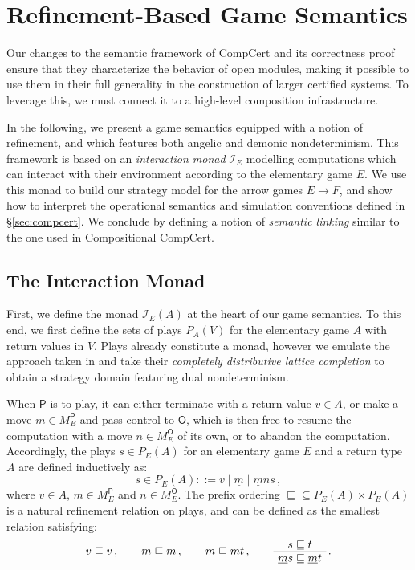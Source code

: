 \documentclass[format=sigplan,authordraft]{acmart}
\newcommand{\kw}[1]{\ensuremath{\mathsf{#1}}}
\begin{document}
\section{Refinement-Based Game Semantics} \label{sec:gamesem} %

Our changes to the semantic framework of CompCert
and its correctness proof
ensure that they characterize the behavior of open modules,
making it possible to use them in their full generality
in the construction of larger certified systems.
To leverage this,
we must connect it to a high-level composition infrastructure.

In the following,
we present a game semantics equipped with a notion of refinement,
and which features both angelic and demonic nondeterminism.
This framework is based on an \emph{interaction monad} $\mathcal{I}_E$
modelling computations which can interact with their environment
according to the elementary game $E$.
We use this monad to build our strategy model for the
arrow games $E \rightarrow F$,
and show how to interpret the operational semantics
and simulation conventions defined in \S\ref{sec:compcert}.
We conclude by defining a notion of \emph{semantic linking}
similar to the one used in Compositional CompCert.

\subsection{The Interaction Monad} \label{sec:monad:def} %

First,
we define the monad $\mathcal{I}_E(A)$
at the heart of our game semantics.
To this end,
we first define the sets of plays $P_A(V)$
for the elementary game $A$ with return values in $V$.
Plays already constitute a monad,
however we emulate the approach taken in \cite{cspdnd}
and take their \emph{completely distributive lattice completion}
to obtain a strategy domain featuring dual nondeterminism.

When $\kw{P}$ is to play,
it can either terminate with a return value $v \in A$,
or make a move $m \in M_E^\kw{P}$ and pass control to $\kw{O}$,
which is then free to resume the computation with
a move $n \in M_E^\kw{O}$ of its own,
or to abandon the computation.
Accordingly,
the plays $s \in P_E(A)$
for an elementary game $E$ and a return type $A$
are defined inductively as:
\[
  s \in P_E(A) ::= v \mid \underline{m} \mid \underline{m} ns \,,
\]
where $v \in A$, $m \in M_E^\kw{P}$ and $n \in M_E^\kw{O}$.
The prefix ordering
${\sqsubseteq} \subseteq P_E(A) \times P_E(A)$
is a natural refinement relation on plays,
and can be defined
as the smallest relation satisfying:
\[
  v \sqsubseteq v \,, \qquad
  \underline{m} \sqsubseteq \underline{m} \,, \qquad
  \underline{m} \sqsubseteq \underline{m}t \,, \qquad
  \AxiomC{$s \sqsubseteq t$}
  \UnaryInfC{$\underline{m}s \sqsubseteq \underline{m}t$}
  \DisplayProof \,.
\]
\end{document}
